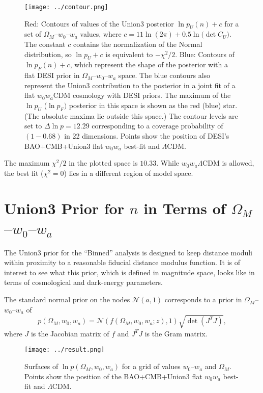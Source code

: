 \documentclass[11pt,a4paper]{article}
\begin{document}
\begin{figure}[htbp] %
   \centering
   \texttt{[image: ../contour.png]} 
   \caption{Red: Contours of values of the Union3 posterior $\ln{p_U}(n)+c$ for a
set of $\Omega_M$--$w_0$--$w_a$ values, where $c= 11\ln{(2\pi)} + 0.5\ln({\det{C_U})}$.  The constant $c$ contains the
normalization of the Normal distribution, so $\ln{p_U}+c$  is equivalent to  $-\chi^2/2$.   
   Blue: Contours of  $\ln{p_F}(n)  +c  $, which represent the shape of the posterior with a flat DESI prior in  $\Omega_M$--$w_0$--$w_a$ space.   
   The blue contours  also represent the Union3 contribution to the posterior in a joint fit of a flat $w_0w_a$CDM cosmology with DESI priors.
   The maximum of the $\ln{p}_U$  ($\ln{p}_F)$ posterior in this space is shown as the red (blue) star.  (The absolute maxima
   lie outside this space.)
   The contour levels are set to $\Delta \ln{p}=12.29$ corresponding to
   a coverage probability of $(1-0.68)$ in 22 dimensions. 
   Points show the position of DESI's  BAO+CMB+Union3 flat $w_0w_a$ best-fit 
    and  $\Lambda$CDM.}
   \label{fig:posterior}
\end{figure}

The maximum $\chi^2/2$ in the plotted space is $10.33$.  While $w_0w_a\Lambda$CDM is allowed, the best fit ($\chi^2=0$) lies in a
different region of model space. 

\section{Union3 Prior for $n$ in Terms of $\Omega_M$--$w_0$--$w_a$}
The Union3 prior for the ``Binned'' analysis is designed to keep distance moduli within  proximity to a reasonable
fiducial distance modulus function.  It is of interest to see what this prior, which is defined in magnitude
space, looks like in terms of cosmological and dark-energy parameters.

The standard normal prior on the nodes $\mathcal{N}(a,1)$ corresponds to a prior in  $\Omega_M$--$w_0$--$w_a$ of
\begin{equation}
p(\Omega_M, w_0,w_a) = \mathcal{N}(f(\Omega_M, w_0, w_a; z),1)  \sqrt{\det{\left(J^T J\right)}},
\end{equation}
where $J$ is the Jacobian matrix of $f$ and $J^TJ$ is the Gram matrix.

\begin{figure}[htbp] %
   \centering
   \texttt{[image: ../result.png]} 
   \caption{Surfaces of $\ln{p}(\Omega_M, w_0,w_a)$  for a grid of values
 $w_0$--$w_a$ and $\Omega_M$.   
   Points show the position of the BAO+CMB+Union3 flat $w_0w_a$ best-fit     and  $\Lambda$CDM.}
   \label{fig:priors}
\end{figure}
\end{document}

